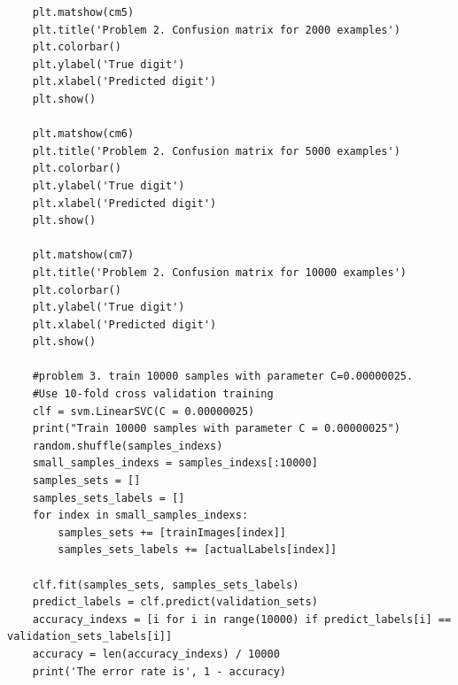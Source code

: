 \documentclass[11pt]{article}
\begin{document}
\begin{lstlisting}
	plt.matshow(cm5)
	plt.title('Problem 2. Confusion matrix for 2000 examples')
	plt.colorbar()
	plt.ylabel('True digit')
	plt.xlabel('Predicted digit')
	plt.show()

	plt.matshow(cm6)
	plt.title('Problem 2. Confusion matrix for 5000 examples')
	plt.colorbar()
	plt.ylabel('True digit')
	plt.xlabel('Predicted digit')
	plt.show()

	plt.matshow(cm7)
	plt.title('Problem 2. Confusion matrix for 10000 examples')
	plt.colorbar()
	plt.ylabel('True digit')
	plt.xlabel('Predicted digit')
	plt.show()

	#problem 3. train 10000 samples with parameter C=0.00000025.
	#Use 10-fold cross validation training
	clf = svm.LinearSVC(C = 0.00000025)
	print("Train 10000 samples with parameter C = 0.00000025")
	random.shuffle(samples_indexs)
	small_samples_indexs = samples_indexs[:10000]
	samples_sets = []
	samples_sets_labels = []
	for index in small_samples_indexs:
		samples_sets += [trainImages[index]]
		samples_sets_labels += [actualLabels[index]]

	clf.fit(samples_sets, samples_sets_labels)
	predict_labels = clf.predict(validation_sets)
	accuracy_indexs = [i for i in range(10000) if predict_labels[i] == validation_sets_labels[i]]
	accuracy = len(accuracy_indexs) / 10000
	print('The error rate is', 1 - accuracy)

\end{lstlisting}
\end{document}
